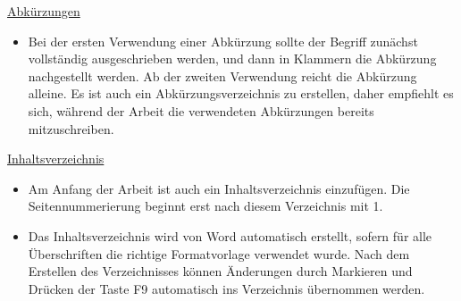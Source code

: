 
\underline{Abkürzungen}
\begin{itemize}
    \item Bei der ersten Verwendung einer Abkürzung sollte der Begriff zunächst vollständig ausgeschrieben werden, und dann in Klammern die Abkürzung nachgestellt werden. Ab der zweiten Verwendung reicht die Abkürzung alleine. Es ist auch ein Abkürzungsverzeichnis zu erstellen, daher empfiehlt es sich, während der Arbeit die verwendeten Abkürzungen bereits mitzuschreiben.
\end{itemize}

\vspace{5mm}

\underline{Inhaltsverzeichnis}
\begin{itemize}
    \item Am Anfang der Arbeit ist auch ein Inhaltsverzeichnis einzufügen. Die Seitennummerierung beginnt erst nach diesem Verzeichnis mit 1.
    \item Das Inhaltsverzeichnis wird von Word automatisch erstellt, sofern für alle Überschriften die richtige Formatvorlage verwendet wurde. Nach dem Erstellen des Verzeichnisses können Änderungen durch Markieren und Drücken der Taste F9 automatisch ins Verzeichnis übernommen werden.
\end{itemize}

\newpage